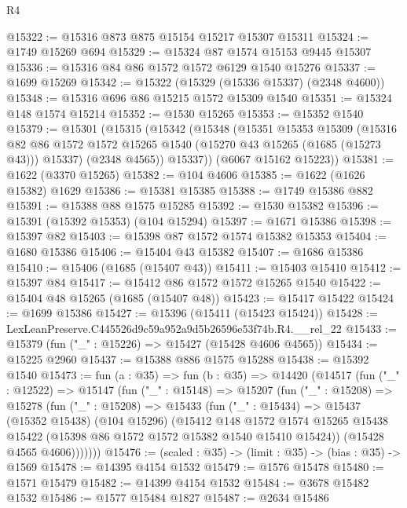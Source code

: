 \begin{lexlean}{R4}
\begin{coremodule}
@15322 := @15316 @873 @875 @15154 @15217 @15307 @15311
@15324 := @1749 @15269 @694
@15329 := @15324 @87 @1574 @15153 @9445 @15307
@15336 := @15316 @84 @86 @1572 @1572 @6129 @1540 @15276
@15337 := @1699 @15269
@15342 := @15322 (@15329 (@15336 @15337) (@2348 @4600))
@15348 := @15316 @696 @86 @15215 @1572 @15309 @1540
@15351 := @15324 @148 @1574 @15214
@15352 := @1530 @15265
@15353 := @15352 @1540
@15379 := @15301
    (@15315
      (@15342
        (@15348
          (@15351
            @15353
            @15309
            (@15316
              @82
              @86
              @1572
              @1572
              @15265
              @1540
              (@15270 @43 @15265 (@1685 (@15273 @43)))
              @15337)
            (@2348 @4565))
          @15337))
      (@6067 @15162 @15223))
@15381 := @1622 (@3370 @15265)
@15382 := @104 @4606
@15385 := @1622 (@1626 @15382) @1629
@15386 := @15381 @15385
@15388 := @1749 @15386 @882
@15391 := @15388 @88 @1575 @15285
@15392 := @1530 @15382
@15396 := @15391 (@15392 @15353) (@104 @15294)
@15397 := @1671 @15386
@15398 := @15397 @82
@15403 := @15398 @87 @1572 @1574 @15382 @15353
@15404 := @1680 @15386
@15406 := @15404 @43 @15382
@15407 := @1686 @15386
@15410 := @15406 (@1685 (@15407 @43))
@15411 := @15403 @15410
@15412 := @15397 @84
@15417 := @15412 @86 @1572 @1572 @15265 @1540
@15422 := @15404 @48 @15265 (@1685 (@15407 @48))
@15423 := @15417 @15422
@15424 := @1699 @15386
@15427 := @15396 (@15411 (@15423 @15424))
@15428 := LexLeanPreserve.C445526d9c59a952a9d5b26596e53f74b.R4.__rel_22
@15433 := @15379 (fun ("_" : @15226) => @15427 (@15428 @4606 @4565))
@15434 := @15225 @2960
@15437 := @15388 @886 @1575 @15288
@15438 := @15392 @1540
@15473 := fun (a : @35) =>
  fun (b : @35) =>
  @14420
    (@14517
      (fun ("_" : @12522) =>
      @15147
        (fun ("_" : @15148) =>
        @15207
          (fun ("_" : @15208) =>
          @15278
            (fun ("_" : @15208) =>
            @15433
              (fun ("_" : @15434) =>
              @15437
                (@15352 @15438)
                (@104 @15296)
                (@15412
                  @148
                  @1572
                  @1574
                  @15265
                  @15438
                  @15422
                  (@15398 @86 @1572 @1572 @15382 @1540 @15410 @15424))
                (@15428 @4565 @4606)))))))
@15476 := (scaled : @35) -> (limit : @35) -> (bias : @35) -> @1569
@15478 := @14395 @4154 @1532
@15479 := @1576 @15478
@15480 := @1571 @15479
@15482 := @14399 @4154 @1532
@15484 := @3678 @15482 @1532
@15486 := @1577 @15484 @1827
@15487 := @2634 @15486

\end{coremodule}
\end{lexlean}
